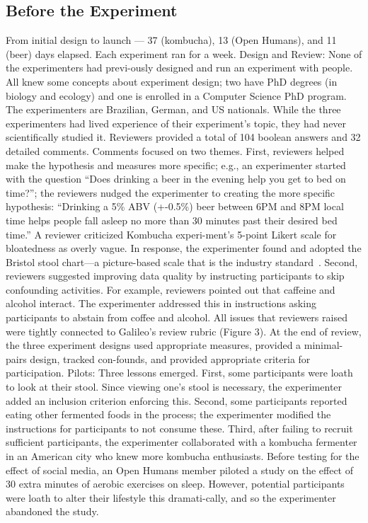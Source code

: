 \subsection{Before the Experiment}
From initial design to launch — 37 (kombucha), 13 (Open Humans), and 11 (beer) days elapsed. Each experiment ran for a week.
Design and Review: None of the experimenters had previ-ously designed and run an experiment with people. All knew some concepts about experiment design; two have PhD degrees (in biology and ecology) and one is enrolled in a Computer Science PhD program. The experimenters are Brazilian, German, and US nationals. While the three experimenters had lived experience of their experiment’s topic, they had never scientifically studied it.
Reviewers provided a total of 104 boolean answers and 32 detailed comments. Comments focused on two themes. First, reviewers helped make the hypothesis and measures more specific; e.g., an experimenter started with the question “Does drinking a beer in the evening help you get to bed on time?”; the reviewers nudged the experimenter to creating the more specific hypothesis: “Drinking a 5\% ABV (+-0.5\%) beer between 6PM and 8PM local time helps people fall asleep no more than 30 minutes past their desired bed time.” A reviewer criticized Kombucha experi-ment’s 5-point Likert scale for bloatedness as overly vague. In response, the experimenter found and adopted the Bristol stool chart—a picture-based scale that is the industry standard~\cite{Wikipedia2018}. Second, reviewers suggested improving data quality by instructing participants to skip confounding activities. For example, reviewers pointed out that caffeine and alcohol interact. The experimenter addressed this in instructions asking participants to abstain from coffee and alcohol. All issues that reviewers raised were tightly connected to Galileo’s review rubric (Figure 3). At the end of review, the three experiment designs used appropriate measures, provided a minimal-pairs design, tracked con-founds, and provided appropriate criteria for participation.
Pilots: Three lessons emerged. First, some participants were loath to look at their stool. Since viewing one’s stool is necessary, the experimenter added an inclusion criterion enforcing this. Second, some participants reported eating other fermented foods in the process; the experimenter modified the instructions for participants to not consume these. Third, after failing to recruit sufficient participants, the experimenter collaborated with a kombucha fermenter in an American city who knew more kombucha enthusiasts. Before testing for the effect of social media, an Open Humans member piloted a study on the effect of 30 extra minutes of aerobic exercises on sleep. However, potential participants were loath to alter their lifestyle this dramati-cally, and so the experimenter abandoned the study. 
